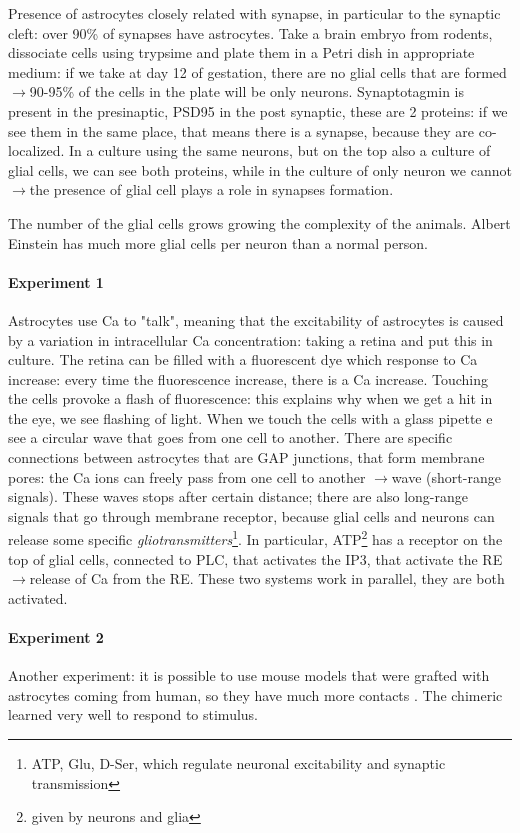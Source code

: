 \documentclass[a4paper, 12pt]{book}
\newcommand{\lfreccia}{\ensuremath{\longrightarrow}}
\begin{document}
Presence of astrocytes closely related with synapse, in particular to the synaptic cleft: over 90\% of synapses have astrocytes. Take a brain embryo from rodents, dissociate cells using trypsime and plate them in a Petri dish in appropriate medium: if we take at day 12 of gestation, there are no glial cells that are formed \lfreccia 90-95\% of the cells in the plate will be only neurons. Synaptotagmin is present in the presinaptic, PSD95 in the post synaptic, these are 2 proteins: if we see them in the same place, that means there is a synapse, because they are co-localized. In a culture using the same neurons, but on the top also a culture of glial cells, we can see both proteins, while in the culture of only neuron we cannot \lfreccia the presence of glial cell plays a role in synapses formation.

The number of the glial cells grows growing the complexity of the animals. Albert Einstein has much more glial cells per neuron than a normal person. 
\paragraph{Experiment 1}
Astrocytes use Ca to "talk", meaning that the excitability of astrocytes is caused by a variation in intracellular Ca concentration: taking a retina and put this in culture. The retina can be filled with a fluorescent dye which response to Ca increase: every time the fluorescence increase, there is a Ca increase. Touching the cells provoke a flash of fluorescence: this explains why when we get a hit in the eye, we see flashing of light. When we touch the cells with a glass pipette e see a circular wave that goes from one cell to another. There are specific connections between astrocytes that are GAP junctions, that form membrane pores: the Ca ions can freely pass from one cell to another \lfreccia wave (short-range signals). These waves stops after certain distance; there are also long-range signals that go through membrane receptor, because glial cells and neurons can release some specific \emph{gliotransmitters}\footnote{ATP, Glu, D-Ser, which regulate neuronal excitability and synaptic transmission}. In particular, ATP\footnote{given by neurons and glia} has a receptor on the top of glial cells, connected to PLC, that activates the IP3, that activate the RE \lfreccia release of Ca from the RE. These two systems work in parallel, they are both activated.
\paragraph{Experiment 2}
Another experiment: it is possible to use mouse models that were grafted with astrocytes coming from human, so they have much more contacts . The chimeric learned very well to respond to stimulus. 
\end{document}
